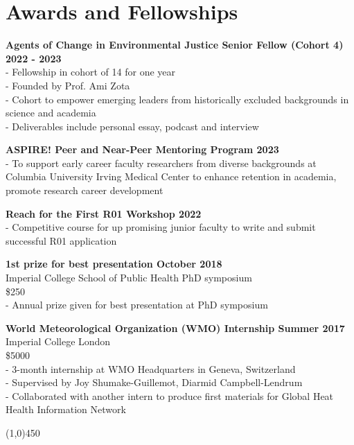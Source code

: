 \section*{Awards and Fellowships}

\noindent \textbf{Agents of Change in Environmental Justice Senior Fellow (Cohort 4) \hfill 2022 - 2023}\\
- Fellowship in cohort of 14 for one year\\
- Founded by Prof. Ami Zota\\
- Cohort to empower emerging leaders from historically excluded backgrounds in science and academia \\
- Deliverables include personal essay, podcast and interview \bigskip

\noindent \textbf{ASPIRE! Peer and Near-Peer Mentoring Program  \hfill 2023} \\
- To support early career faculty researchers from diverse backgrounds at Columbia University Irving Medical Center to enhance retention in academia, promote research career development \bigskip

\noindent \textbf{Reach for the First R01 Workshop \hfill 2022}\\ 
- Competitive course for up promising junior faculty to write and submit successful R01 application \bigskip

\noindent \textbf{1st prize for best presentation \hfill October 2018 }\\
Imperial College School of Public Health PhD symposium \\
\$250 \\
- Annual prize given for best presentation at PhD symposium \bigskip

\noindent \textbf{World Meteorological Organization (WMO) Internship \hfill Summer 2017 }\\ 
Imperial College London \\
\$5000 \\
- 3-month internship at WMO Headquarters in Geneva, Switzerland \\
- Supervised by Joy Shumake-Guillemot, Diarmid Campbell-Lendrum \\
- Collaborated with another intern to produce first materials for Global Heat Health Information Network \bigskip

\begin{center} \line(1,0){450} \end{center}